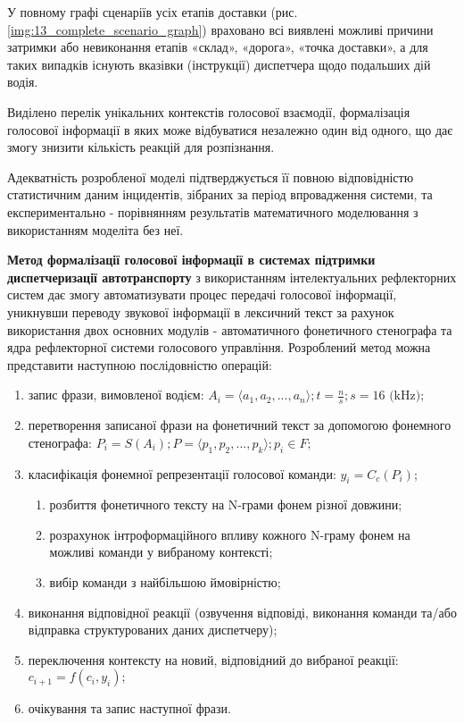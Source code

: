 У повному графі сценаріїв усіх етапів доставки (рис. \ref{img:13_complete_scenario_graph}) враховано всі виявлені можливі причини затримки або невиконання етапів «склад», «дорога», «точка доставки», а для таких випадків існують вказівки (інструкції) диспетчера щодо подальших дій водія.

Виділено перелік унікальних контекстів голосової взаємодії, формалізація голосової інформації в яких може відбуватися незалежно один від одного, що дає змогу знизити кількість реакцій для розпізнання.

Адекватність розробленої моделі підтверджується її  повною відповідністю статистичним даним інцидентів, зібраних за період впровадження системи, та експериментально - порівнянням результатів математичного моделювання з використанням моделіта без неї.

\textbf{Метод формалізації голосової інформації в системах підтримки диспетчеризації автотранспорту} з використанням інтелектуальних рефлекторних систем дає змогу автоматизувати процес передачі голосової інформації, уникнувши переводу звукової інформації в лексичний текст за рахунок використання двох основних модулів - автоматичного фонетичного стенографа та ядра рефлекторної системи голосового управління. Розроблений метод можна представити наступною послідовністю операцій:

\begin{enumerate}
	\item запис фрази, вимовленої водієм: $A_i=\langle a_1,a_2,...,a_n\rangle; t=\frac{n}{s}; s=16 \text{ (kHz)};$
	\item перетворення записаної фрази на фонетичний текст за допомогою фонемного стенографа: $P_i=S(A_i); P=\langle p_1,p_2,...,p_k\rangle; p_i \in F;$
	\item класифікація фонемної репрезентації голосової команди: $y_i=C_c(P_i);$
	\begin{enumerate}
		\item розбиття фонетичного тексту на N-грами фонем різної довжини;
		\item розрахунок інтроформаційного впливу кожного N-граму фонем на можливі команди у вибраному контексті;
		\item вибір команди з найбільшою ймовірністю;
	\end{enumerate}
	\item виконання відповідної реакції (озвучення відповіді, виконання команди та/або відправка структурованих даних диспетчеру);
	\item переключення контексту на новий, відповідний до вибраної реакції: $c_{i+1} = f(c_i, y_i);$
	\item очікування та запис наступної фрази.
\end{enumerate}


